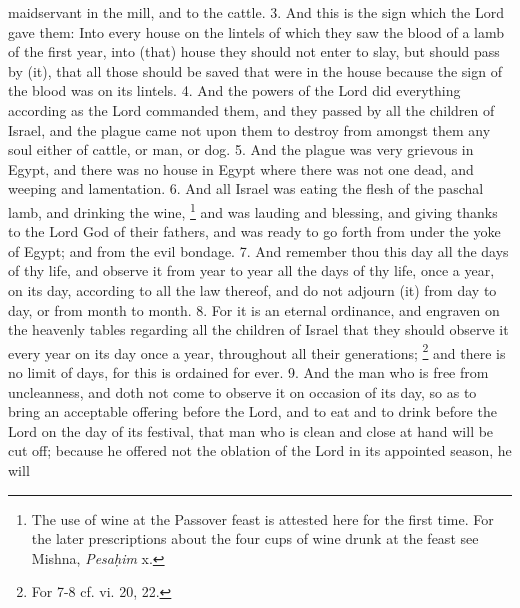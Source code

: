 maidservant in the mill, and to the cattle. 3. And this is the sign which the Lord gave them: Into every house on the lintels of which they saw the blood of a lamb of the first year, into (that) house they should not enter to slay, but should pass by (it), that all those should be saved that were in the house because the sign of the blood was on its lintels. 4. And the powers of the Lord did everything according as the Lord commanded them, and they passed by all the children of Israel, and the plague came not upon them to destroy from amongst them any soul either of cattle, or man, or dog. 5. And the plague was very grievous in Egypt, and there was no house in Egypt where there was not one dead, and weeping and lamentation. 6. And all Israel was eating the flesh of the paschal lamb, and drinking the wine, \footnote{The use of wine at the Passover feast is attested here for the first time. For the later prescriptions about the four cups of wine drunk at the feast see Mishna, \emph{Pesa\d{h}im} x.} and was lauding and blessing, and giving thanks to the Lord God of their fathers, and was ready to go forth from under the yoke of Egypt; and from the evil bondage. 7. And remember thou this day all the days of thy life, and observe it from year to year all the days of thy life, once a year, on its day, according to all the law thereof, and do not adjourn (it) from day to day, or from month to month. 8. For it is an eternal ordinance, and engraven on the heavenly tables regarding all the children of Israel that they should observe it every year on its day once a year, throughout all their generations; \footnote{For 7-8 cf. vi. 20, 22.} and there is no limit of days, for this is ordained for ever. 9. And the man who is free from uncleanness, and doth not come to observe it on occasion of its day, so as to bring an acceptable offering before the Lord, and to eat and to drink before the Lord on the day of its festival, that man who is clean and close at hand will be cut off; because he offered not the oblation of the Lord in its appointed season, he will


